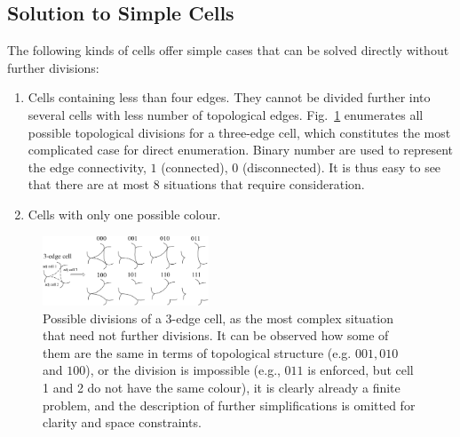 \documentclass[journal]{IEEEtran}
\begin{document}
\subsection{Solution to Simple Cells}
\label{sec:simple_cell}
The following kinds of cells offer simple cases that can be solved directly without further divisions:
\begin{enumerate}
\item Cells containing less than four edges. They cannot be divided further into several cells with less number of topological edges. Fig.~\ref{figeasycell3} enumerates all possible topological divisions for a three-edge cell, which constitutes the most complicated case for direct enumeration. Binary number are used to represent the edge connectivity, $1$ (connected), $0$ (disconnected). It is thus easy to see that there are at most $8$ situations that require consideration.
\item Cells with only one possible colour.
\end{enumerate}

\begin{figure}[t]
\centering
\includegraphics[width = 0.44\textwidth]{figures/other_figures/cell3}
\caption{Possible divisions of a 3-edge cell, as the most complex situation that need not further divisions. It can be observed how some of them are the same in terms of topological structure (e.g. $001, 010$ and $100$), 
or the division is impossible %
(e.g., $011$ is enforced, but cell 1 and 2 do not have the same colour), it is clearly already a finite problem, and the description of   further simplifications is omitted for clarity and space constraints.}
\label{figeasycell3}
\end{figure}
\end{document}
